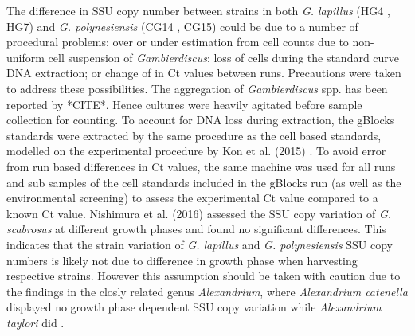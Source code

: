 \documentclass[12pt]{article}
\begin{document}
The difference in SSU copy number between strains in both \emph{G. lapillus} (HG4 , HG7) and \emph{G. polynesiensis} (CG14 , CG15) could be due to a number of procedural problems: over or under estimation from cell counts due to non-uniform cell suspension of \emph{Gambierdiscus}; loss of cells during the standard curve DNA extraction; or change of in Ct values between runs. Precautions were taken to address these possibilities. The aggregation of \emph{Gambierdiscus} spp. has been reported by *CITE*. Hence cultures were heavily agitated before sample collection for counting. To account for DNA loss during extraction, the gBlocks standards were extracted by the same procedure as the cell based standards, modelled on the experimental procedure by Kon et al. (2015) \cite{kon2015spatial}. To avoid error from run based differences in Ct values, the same machine was used for all runs and sub samples of the cell standards included in the gBlocks run (as well as the environmental screening) to assess the experimental Ct value compared to a known Ct value. 
Nishimura et al. (2016) assessed the SSU copy variation of \emph{G. scabrosus} at different growth phases and found no significant differences. 
This indicates that the strain variation of \emph{G. lapillus} and \emph{G. polynesiensis} SSU copy numbers is likely not due to difference in growth phase when harvesting respective strains. 
However this assumption should be taken with caution due to the findings in the closly related genus \emph{Alexandrium}, where \emph{Alexandrium catenella} displayed no growth phase dependent SSU copy variation while \emph{Alexandrium taylori} did \cite{galluzzi2010analysis}. %




\end{document}
